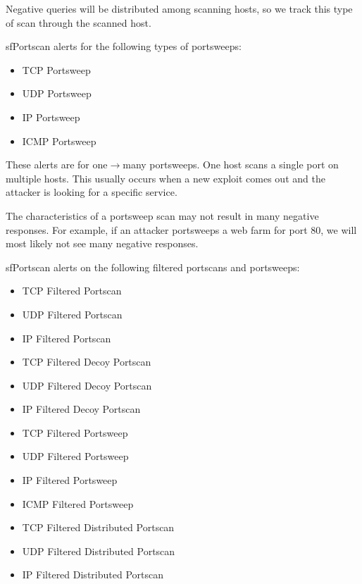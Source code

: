 \documentclass[english]{report}
\newenvironment{note}{
\samepage
    \vspace{10pt}{\textsf{
        {\hspace{7pt}\Huge{$\triangle$\hspace{-12.5pt}{\Large{$^!$}}}}\hspace{5pt}
        {\Large{NOTE}}
    }
    }
   \begin{center}
    \par\vspace{-17pt}

    \begin{lrbox}{\savepar}
    \begin{minipage}[r]{6in}
}
{
    \end{minipage}
    \end{lrbox}
    \fbox{
        \usebox{
            \savepar
	}
    }
    \par\vskip10pt
    \end{center}
}
\begin{document}
\begin{note}
Negative queries will be distributed among scanning hosts, so
we track this type of scan through the scanned host.
\end{note}

sfPortscan alerts for the following types of portsweeps:
\begin{itemize}
\item TCP Portsweep
\item UDP Portsweep
\item IP Portsweep
\item ICMP Portsweep
\end{itemize}

These alerts are for one$\rightarrow$many portsweeps. One host scans a single port
on multiple hosts. This usually occurs when a new exploit comes out and the
attacker is looking for a specific service. 

\begin{note}
The characteristics of a portsweep scan may not result in many
negative responses. For example, if an attacker portsweeps a web farm
for port 80, we will most likely not see many negative responses.
\end{note}

sfPortscan alerts on the following filtered portscans and portsweeps:

\begin{itemize}
\item TCP Filtered Portscan
\item UDP Filtered Portscan
\item IP Filtered Portscan

\item TCP Filtered Decoy Portscan
\item UDP Filtered Decoy Portscan
\item IP Filtered Decoy Portscan

\item TCP Filtered Portsweep
\item UDP Filtered Portsweep
\item IP Filtered Portsweep
\item ICMP Filtered Portsweep

\item TCP Filtered Distributed Portscan
\item UDP Filtered Distributed Portscan
\item IP Filtered Distributed Portscan
\end{itemize}
\end{document}
